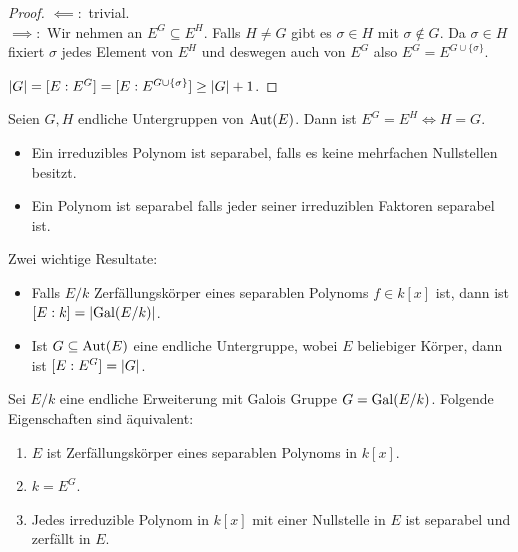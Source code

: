 \begin{proof}
	$\impliedby:$ trivial.\\
	$\implies:$ Wir nehmen an $E^{G} \subseteq E^{H}$. Falls $H \neq G$ gibt es $\sigma \in H$ mit $\sigma \not\in G$.
	Da $\sigma \in H$ fixiert $\sigma$ jedes Element von $E^{H}$ und deswegen auch von $E^{G}$ also $ E^{G} = E^{G \cup \{\sigma\} }$.

	$\abs{G} = [E : E^{G}] = [E: E^{G \cup \{\sigma\}}] \geq \abs{G} + 1$. \contra
\end{proof}

\begin{corollary}
	Seien $G,H$ endliche Untergruppen von $\operatorname{Aut}(E)$. Dann ist $E^{G} = E^{H} \Leftrightarrow H = G$.
\end{corollary}

\begin{definition}[Wiederholung]
	\begin{itemize}[-]
		\item Ein irreduzibles Polynom ist separabel, falls es keine mehrfachen Nullstellen besitzt.
		\item Ein Polynom ist separabel falls jeder seiner irreduziblen Faktoren separabel ist.
	\end{itemize}
\end{definition}

Zwei wichtige Resultate:
\begin{itemize}[-]
	\item Falls $E / k$ Zerfällungskörper eines separablen Polynoms $f \in k[x]$ ist, dann ist $[E:k] = \abs{\operatorname{Gal}(E / k)}$.
	\item Ist $G \subseteq \operatorname{Aut}(E)$ eine endliche Untergruppe, wobei $E$ beliebiger Körper, dann ist $[E : E^{G}] = \abs{G}$.
\end{itemize}

\begin{theorem}
	Sei $E / k$ eine endliche Erweiterung mit Galois Gruppe $G = \operatorname{Gal}(E / k)$. Folgende Eigenschaften sind äquivalent:
	\begin{enumerate}[(1)]
		\item $E$ ist Zerfällungskörper eines separablen Polynoms in $k[x]$.
		\item $k = E^{G}$.
		\item Jedes irreduzible Polynom in $k[x]$ mit einer Nullstelle in $E$ ist separabel und zerfällt in $E$.
	\end{enumerate}
\end{theorem}

